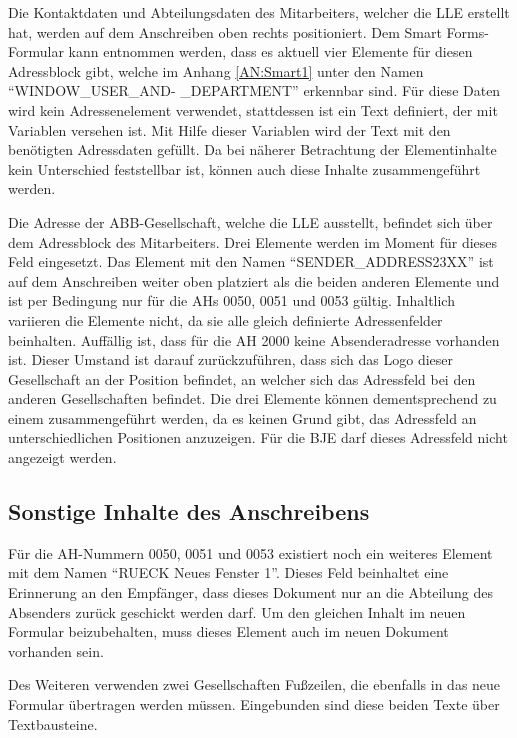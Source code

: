 	Die Kontaktdaten und Abteilungsdaten des Mitarbeiters, welcher die \ac{LLE} erstellt hat, werden auf dem Anschreiben oben rechts positioniert.
	Dem Smart Forms-Formular kann entnommen werden, dass es aktuell vier Elemente für diesen Adressblock gibt, welche im Anhang \ref{AN:Smart1} unter den Namen "`WINDOW\_USER\_AND-
	\_DEPARTMENT"' erkennbar sind. Für diese Daten wird kein Adressenelement verwendet, stattdessen ist ein Text definiert, der mit Variablen versehen ist. Mit Hilfe dieser Variablen wird der Text mit den benötigten Adressdaten gefüllt. Da bei näherer Betrachtung der Elementinhalte kein Unterschied feststellbar ist, können auch diese Inhalte zusammengeführt werden.
	
	Die Adresse der \ac{ABB}-Gesellschaft, welche die \ac{LLE} ausstellt, befindet sich über dem Adressblock des Mitarbeiters. Drei Elemente werden im Moment für dieses Feld eingesetzt. Das Element mit den Namen "`SENDER\_ADDRESS23XX"' ist auf dem Anschreiben weiter oben platziert als die beiden anderen Elemente und ist per Bedingung nur für die \ac{AH}s 0050, 0051 und 0053 gültig. Inhaltlich variieren die Elemente nicht, da sie alle gleich definierte Adressenfelder beinhalten. Auffällig ist, dass für die \ac{AH} 2000 keine Absenderadresse vorhanden ist. Dieser Umstand ist darauf zurückzuführen, dass sich das Logo dieser Gesellschaft an der Position befindet, an welcher sich das Adressfeld bei den anderen Gesellschaften befindet. Die drei Elemente können dementsprechend zu einem zusammengeführt werden, da es keinen Grund gibt, das Adressfeld an unterschiedlichen Positionen anzuzeigen. Für die \ac{BJE} darf dieses Adressfeld nicht angezeigt werden.
	
	\subsection{Sonstige Inhalte des Anschreibens}
	\label{ist:rueck}
	
	Für die \ac{AH}-Nummern 0050, 0051 und 0053 existiert noch ein weiteres Element mit dem Namen "`RUECK Neues Fenster 1"'. Dieses Feld beinhaltet eine Erinnerung an den Empfänger, dass dieses Dokument nur an die Abteilung des Absenders zurück geschickt werden darf. Um den gleichen Inhalt im neuen Formular beizubehalten, muss dieses Element auch im neuen Dokument vorhanden sein.
	
	Des Weiteren verwenden zwei Gesellschaften Fußzeilen, die ebenfalls in das neue Formular übertragen werden müssen. Eingebunden sind diese beiden Texte über Textbausteine.
	
